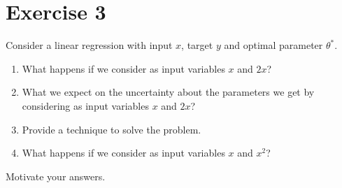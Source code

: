 \section{Exercise 3}

Consider a linear regression with input $x$, target $y$ and optimal parameter $\theta^\ast$.
\begin{enumerate}
    \item What happens if we consider as input variables $x$ and $2x$?
    \item What we expect on the uncertainty about the parameters we get by considering as input variables $x$ and $2x$?
    \item Provide a technique to solve the problem.
    \item What happens if we consider as input variables $x$ and $x^2$?
\end{enumerate}
Motivate your answers.

